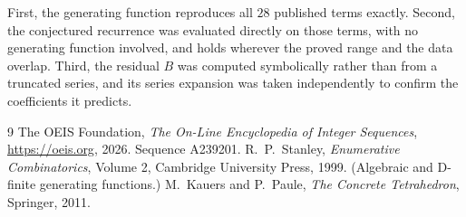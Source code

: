 \documentclass[11pt,a4paper]{article}
\theoremstyle{plain}
\theoremstyle{definition}
\begin{document}
First, the generating function reproduces all $28$ published terms exactly. Second,
the conjectured recurrence was evaluated directly on those terms, with no generating function
involved, and holds wherever the proved range and the data overlap. Third, the residual $B$ was
computed symbolically rather than from a truncated series, and its series expansion was taken
independently to confirm the coefficients it predicts.

\begin{thebibliography}{9}
 The OEIS Foundation, \emph{The On-Line Encyclopedia of Integer Sequences},
\url{https://oeis.org}, 2026. Sequence A239201.
 R.~P.~Stanley, \emph{Enumerative Combinatorics}, Volume 2, Cambridge
University Press, 1999. (Algebraic and D-finite generating functions.)
 M.~Kauers and P.~Paule, \emph{The Concrete Tetrahedron}, Springer, 2011.
\end{thebibliography}
\end{document}
